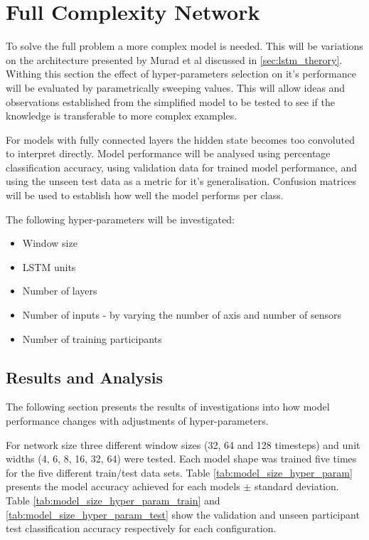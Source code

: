 \documentclass[sensors,article,submit,moreauthors,pdftex]{Definitions/mdpi}
\begin{document}
\section{Full Complexity Network}
\label{sec:full_complexity}
To solve the full problem a more complex model is needed. This will be variations on the architecture presented by Murad et al discussed in \ref{sec:lstm_therory}. Withing this section the effect of hyper-parameters selection on it's performance will be evaluated by parametrically sweeping values. This will allow ideas and observations established from the simplified model to be tested to see if the knowledge is transferable to more complex examples.

For models with fully connected layers the hidden state becomes too convoluted to interpret directly. Model performance will be analysed using percentage classification accuracy, using validation data for trained model performance, and using the unseen test data as a metric for it's generalisation. Confusion matrices will be used to establish how well the model performs per class.

The following hyper-parameters will be investigated:
\begin{itemize}
    \item Window size
    \item LSTM units
    \item Number of layers
    \item Number of inputs - by varying the number of axis and number of sensors
    \item Number of training participants
\end{itemize}

\subsection{Results and Analysis}
The following section presents the results of investigations into how model performance changes with adjustments of hyper-parameters.

For network size three different window sizes (32, 64 and 128 timesteps) and unit widths (4, 6, 8, 16, 32, 64) were tested. Each model shape was trained five times for the five different train/test data sets. Table \ref{tab:model_size_hyper_param} presents the model accuracy achieved for each models $\pm$ standard deviation. Table \ref{tab:model_size_hyper_param_train} and \ref{tab:model_size_hyper_param_test} show the validation and unseen participant test classification accuracy respectively for each configuration.
\end{document}
